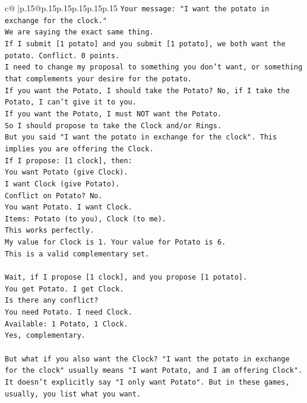\documentclass{article}
\begin{document}
{\begin{supertabular}{c@{$\;$}|p{.15\linewidth}@{}p{.15\linewidth}p{.15\linewidth}p{.15\linewidth}p{.15\linewidth}p{.15\linewidth}}
{{{\texttt{Your message: "I want the potato in exchange for the clock."} \\
\texttt{We are saying the exact same thing.} \\
\texttt{If I submit {[}1 potato{]} and you submit {[}1 potato{]}, we both want the potato. Conflict. 0 points.} \\
\texttt{I need to change my proposal to something you don't want, or something that complements your desire for the potato.} \\
\texttt{If you want the Potato, I should take the Potato? No, if I take the Potato, I can't give it to you.} \\
\texttt{If you want the Potato, I must NOT want the Potato.} \\
\texttt{So I should propose to take the Clock and/or Rings.} \\
\texttt{But you said "I want the potato in exchange for the clock". This implies you are offering the Clock.} \\
\texttt{If I propose: {[}1 clock{]}, then:} \\
\texttt{You want Potato (give Clock).} \\
\texttt{I want Clock (give Potato).} \\
\texttt{Conflict on Potato? No.} \\
\texttt{You want Potato. I want Clock.} \\
\texttt{Items: Potato (to you), Clock (to me).} \\
\texttt{This works perfectly.} \\
\texttt{My value for Clock is 1. Your value for Potato is 6.} \\
\texttt{This is a valid complementary set.} \\
\\ 
\texttt{Wait, if I propose {[}1 clock{]}, and you propose {[}1 potato{]}.} \\
\texttt{You get Potato. I get Clock.} \\
\texttt{Is there any conflict?} \\
\texttt{You need Potato. I need Clock.} \\
\texttt{Available: 1 Potato, 1 Clock.} \\
\texttt{Yes, complementary.} \\
\\ 
\texttt{But what if you also want the Clock? "I want the potato in exchange for the clock" usually means "I want Potato, and I am offering Clock". It doesn't explicitly say "I only want Potato". But in these games, usually, you list what you want.} \\
}}}
\end{supertabular}}
\end{document}
